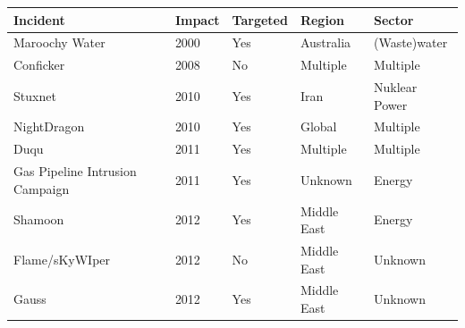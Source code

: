 \documentclass[runningheads]{llncs}
\begin{document}
\begin{table}[h]
	\centering
    \begin{tabular}{|l|l|l|l|l|}
    \hline
    \textbf{Incident}               & \multicolumn{1}{l|}{\textbf{Impact}} & \multicolumn{1}{l|}{\textbf{Targeted}} & \multicolumn{1}{l|}{\textbf{Region}} & \textbf{Sector} \\ \hline
    Maroochy Water                  & 2000                                       & Yes                                    & Australia                                    & (Waste)water                         \\
    Conficker                       & 2008                                       & No                                     & Multiple                              & Multiple                             \\
    Stuxnet                         & 2010                                       & Yes                                    & Iran                                         & Nuklear Power                        \\
    NightDragon                     & 2010                                       & Yes                                    & Global                                       & Multiple                             \\
    Duqu                            & 2011                                       & Yes                                    & Multiple                                     & Multiple                            \\
    Gas Pipeline Intrusion Campaign & 2011                                       & Yes                                    & Unknown                                            & Energy                               \\
    Shamoon                         & 2012                                       & Yes                                    & Middle East                                  & Energy                               \\
    Flame/sKyWIper                  & 2012                                       & No                                     & Middle East                                  & Unknown                                    \\
    Gauss                           & 2012                                       & Yes                                    & Middle East                                  & Unknown                                    \\

\end{tabular}
\end{table}
\end{document}
